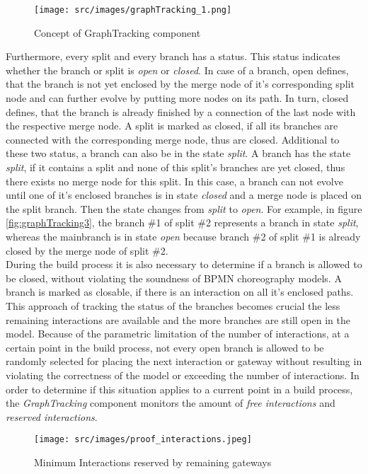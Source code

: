 \begin{figure}[H]
\texttt{[image: src/images/graphTracking\_1.png]}
\caption{Concept of GraphTracking component}
\label{fig:graphTracking1}
\end{figure}

Furthermore, every split and every branch has a status. This status indicates whether the branch or split is \textit{open} or \textit{closed}. In case of a branch, open defines, that the branch is not yet enclosed by the merge node of it's corresponding split node and can further evolve by putting more nodes on its path. In turn, closed defines, that the branch is already finished by a connection of the last node with the respective merge node. A split is marked as closed, if all its branches are connected with the corresponding merge node, thus are closed. Additional to these two status, a branch can also be in the state \textit{split}. A branch has the state \textit{split}, if it contains a split and none of this split's branches are yet closed, thus there exists no merge node for this split. In this case, a branch can not evolve until one of it's enclosed branches is in state \textit{closed} and a merge node is placed on the split branch. Then the state changes from \textit{split} to \textit{open}. For example, in figure \ref{fig:graphTracking3}, the branch \#1 of split \#2 represents a branch in state \textit{split}, whereas the mainbranch is in state \textit{open} because branch \#2 of split \#1 is already closed by the merge node of split \#2.\\
During the build process it is also necessary to determine if a branch is allowed to be closed, without violating the soundness of BPMN choreography models. A branch is marked as closable, if there is an interaction on all it's enclosed paths. This approach of tracking the status of the branches becomes crucial the less remaining interactions are available and the more branches are still open in the model. Because of the parametric limitation of the number of interactions, at a certain point in the build process, not every open branch is allowed to be randomly selected for placing the next interaction or gateway without resulting in violating the correctness of the model or exceeding the number of interactions. In order to determine if this situation applies to a current point in a build process, the \textit{GraphTracking} component monitors the amount of \textit{free interactions} and \textit{reserved interactions}. 

\begin{figure}[H]
\texttt{[image: src/images/proof\_interactions.jpeg]}
\caption{Minimum Interactions reserved by remaining gateways}
\label{fig:graphTracking4}
\end{figure}

